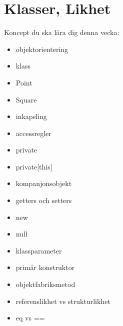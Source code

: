 \chapter{Klasser, Likhet}\label{chapter:W06}
Koncept du ska lära dig denna vecka:
\begin{multicols}{2}\begin{itemize}[nosep,label={$\square$},leftmargin=*]
\item objektorientering
\item klass
\item Point
\item Square
\item inkapsling
\item accessregler
\item private
\item private[this]
\item kompanjonsobjekt
\item getters och setters
\item new
\item null
\item klassparameter
\item primär konstruktor
\item objektfabriksmetod
\item referenslikhet vs strukturlikhet
\item eq vs ==\end{itemize}\end{multicols}
